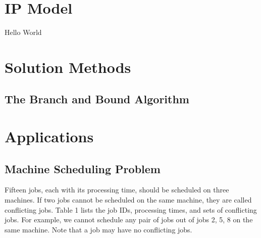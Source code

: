 \documentclass[letterpaper,10pt,english]{sphinxmanual}
\begin{document}
\section{IP Model}
\label{\detokenize{operationsResearch/IP:ip-model}}
\sphinxAtStartPar
Hello World


\section{Solution Methods}
\label{\detokenize{operationsResearch/IP:solution-methods}}

\subsection{The Branch and Bound Algorithm}
\label{\detokenize{operationsResearch/IP:the-branch-and-bound-algorithm}}

\section{Applications}
\label{\detokenize{operationsResearch/IP:applications}}

\subsection{Machine Scheduling Problem}
\label{\detokenize{operationsResearch/IP:machine-scheduling-problem}}
\sphinxAtStartPar
Fifteen jobs, each with its processing time, should be scheduled on three machines.
If two jobs cannot be scheduled on the same machine, they are called conflicting jobs.
Table 1 lists the job IDs, processing times, and sets of conflicting jobs.
For example, we cannot schedule any pair of jobs out of jobs 2, 5, 8 on the same machine.
Note that a job may have no conflicting jobs.
\end{document}
